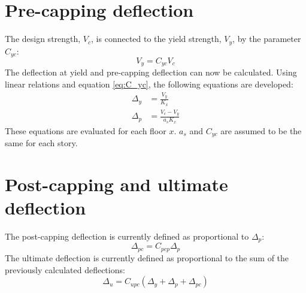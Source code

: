 \documentclass[11pt,letterpaper]{article}
\begin{document}
\section{Pre-capping deflection}
The design strength, $V_c$, is connected to the yield strength, $V_y$, by the parameter $C_{yc}$:
\begin{equation} \label{eq:C_yc}
  V_y = C_{yc}V_c
\end{equation}
The deflection at yield and pre-capping deflection can now be calculated. Using linear relations and equation \eqref{eq:C_yc}, the following equations are developed:
\begin{align}
  Δ_{y} &= \frac{V_y}{K_x}         \label{eq:deflecty} \\
  Δ_{p} &= \frac{V_c-V_y}{a_sK_x}  \label{eq:deflectp}
\end{align}
These equations are evaluated for each floor $x$. $a_s$ and $C_{yc}$ are assumed to be the same for each story.

\section{Post-capping and ultimate deflection}
The post-capping deflection is currently defined as proportional to $Δ_p$:
\begin{equation}
  Δ_{pc} = C_{pcp}Δ_p
\end{equation}
The ultimate deflection is currently defined as proportional to the sum of the previously calculated deflections:
\begin{equation}
  Δ_u = C_{upc}\left(Δ_y + Δ_p + Δ_{pc}\right)
\end{equation}
\end{document}
